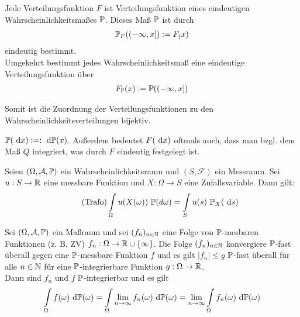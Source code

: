 \begin{satz}[Korrespondenzsatz]\label{satzKorrespondenzsatz}\enter
	Jede Verteilungsfunktion $F$ ist Verteilungsfunktion eines eindeutigen Wahrscheinlichkeitsmaßes $\P$. 
	Dieses Maß $\P$ ist durch
	\begin{align*}
		\P_F((-\infty,x]):=F_(x)
	\end{align*}
	eindeutig bestimmt.\\
	Umgekehrt bestimmt jedes Wahrscheinlichkeitsmaß eine eindeutige Verteilungsfunktion über
	\begin{align*}
		F_{\P}(x):=\P((-\infty,x])
	\end{align*}

	Somit ist die Zuordnung der Verteilungsfunktionen zu den Wahrscheinlichkeitsverteilungen bijektiv. 
\end{satz}

\begin{notation}
	$\P(\d x):=:\d\P(x)$. 
	Außerdem bedeutet $F(\d x)$ oftmals auch, dass man bzgl. dem Maß $Q$ integriert, was durch $F$ eindeutig festgelegt ist.
\end{notation}

\begin{satz}[Transformationssatz]\label{satzTransformationssatz}\enter
	Seien $(\Omega,\A,\P)$ ein Wahrscheinlichkeitsraum und $(S,\mathcal{F})$ ein Messraum.
	Sei $u:S\to\R$ eine messbare Funktion und $X:\Omega\to S$ eine Zufallsvariable. 
	Dann gilt:
	\begin{align}\label{eqTrafo}\tag{Trafo}
		\int\limits_\Omega u(X(\omega))~\P(d\omega)=\int\limits_S u(s)~\P_X(\d s)
	\end{align}
\end{satz}

\begin{satz}\label{satzMajorisierteKonvergenz}\enter
	Sei $(\Omega,\A,\P)$ ein Maßraum und sei $(f_n)_{n\in\N}$ eine Folge von $\P$-mesbaren Funktionen (z. B. ZV) $f_n:\Omega\to\R\cup\lbrace\infty\rbrace$. 
	Die Folge $(f_n)_{n\in\N}$ konvergiere $\P$-fast überall gegen eine $\P$-messbare Funktion $f$ und es gilt $|f_n|\leq g$ $\P$-fast überall für alle $n\in\N$ für eine $\P$-integrierbare Funktion $g:\Omega\to\R$.\\
	Dann sind $f_n$ und $f$ $\P$-integrierbar und es gilt
	\begin{align*}
		\int\limits_\Omega f(\omega)\d\P(\omega)=\int\limits_\Omega \limn f_n(\omega)\d\P(\omega)
		=\limn\int\limits_\Omega f_n(\omega)\d\P(\omega)
	\end{align*}
\end{satz}

